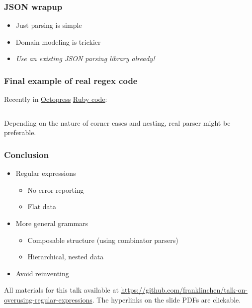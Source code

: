 \begin{frame}
  \frametitle{JSON wrapup}

  \begin{itemize}
    \item<1-> Just parsing is simple
    \item<2-> Domain modeling is trickier
    \item<3-> \emph{Use an existing JSON parsing library already!} 
  \end{itemize}
\end{frame}

\begin{frame}[fragile]
  \frametitle{Final example of real regex code}

  Recently in \href{http://octopress.org/}{Octopress} \href{https://github.com/imathis/octopress/blob/3bb4a14212b226d1da3acd546584d7117557a1ae/lib/octopress/liquid\_helpers/conditional.rb}{Ruby code}:

  \inputminted{ruby}{extra/conditional.rb}

  Depending on the nature of corner cases and nesting, real parser might be preferable.
\end{frame}

\begin{frame}
  \frametitle{Conclusion}

  \begin{itemize}
    \item Regular expressions
      \begin{itemize}
        \item No error reporting
        \item Flat data
      \end{itemize}
    \item More general grammars
      \begin{itemize}
        \item Composable structure (using combinator parsers)
        \item Hierarchical, nested data
      \end{itemize}
    \item Avoid reinventing
  \end{itemize}

  All materials for this talk available at \url{https://github.com/franklinchen/talk-on-overusing-regular-expressions}. The hyperlinks on the slide PDFs are clickable.
\end{frame}


